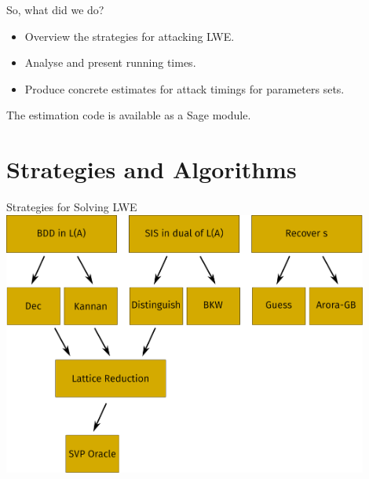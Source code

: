 \documentclass[10pt,compress]{beamer}
\begin{document}
\begin{frame}{So, what did we do?}
  \begin{itemize}
  \item Overview the \alert{strategies} for attacking LWE.{}
  \item Analyse and present \alert{running times}. 
  \item Produce \alert{concrete estimates} for attack timings for parameters sets.
  \end{itemize} 

  The estimation code is available as a Sage module.
  \end{frame}

\section{Strategies and Algorithms}

\begin{frame}{Strategies for Solving LWE}
  \includegraphics[width=0.9\textwidth]{overviewflowchart.pdf}
\end{frame}
\end{document}
